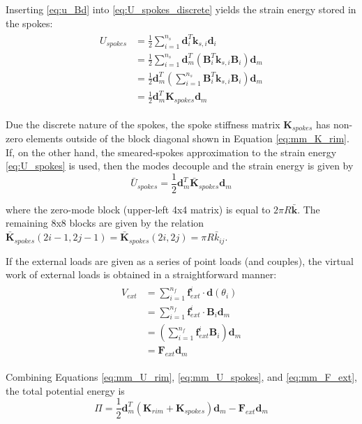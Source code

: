 \documentclass[\rootdir/thesis.tex]{subfiles}
\begin{document}
Inserting \eqref{eq:u_Bd} into \eqref{eq:U_spokes_discrete} yields the strain energy stored in the spokes:
\begin{align}
\label{eq:mm_U_spokes}
\begin{split}
U_{spokes} &= \frac{1}{2} \sum_{i=1}^{n_s} \mathbf{d}_i^T \mathbf{k}_{s,i} \mathbf{d}_i\\
&= \frac{1}{2} \sum_{i=1}^{n_s} \mathbf{d}_m^T \left(\mathbf{B}_i^T\mathbf{k}_{s, i}\mathbf{B}_i \right)\mathbf{d}_m\\
&= \frac{1}{2} \mathbf{d}_m^T \left(\sum_{i=1}^{n_s} \mathbf{B}_i^T\mathbf{k}_{s, i}\mathbf{B}_i \right) \mathbf{d}_m\\
&= \frac{1}{2} \mathbf{d}_m^T \mathbf{K}_{spokes} \mathbf{d}_m
\end{split}
\end{align}

Due the discrete nature of the spokes, the spoke stiffness matrix $\mathbf{K}_{spokes}$ has non-zero elements outside of the block diagonal shown in Equation \eqref{eq:mm_K_rim}. If, on the other hand, the smeared-spokes approximation to the strain energy \eqref{eq:U_spokes} is used, then the modes decouple and the strain energy is given by
\begin{equation}
\label{eq:U_spokes_smeared}
\bar{U}_{spokes} = \frac{1}{2} \mathbf{d}_m^T \bar{\mathbf{K}}_{spokes} \mathbf{d}_m
\end{equation}

where the zero-mode block (upper-left 4x4 matrix) is equal to $2\pi R\mathbf{\bar{k}}$. The remaining 8x8 blocks are given by the relation $\mathbf{\bar{K}}_{spokes}(2i-1, 2j-1) = \mathbf{\bar{K}}_{spokes}(2i, 2j) = \pi R \bar{k}_{ij}$.

If the external loads are given as a series of point loads (and couples), the virtual work of external loads is obtained in a straightforward manner:
\begin{align}
\label{eq:mm_F_ext}
\begin{split}
V_{ext} &= \sum_{i=1}^{n_f} \mathbf{f}_{ext}^i \cdot \mathbf{d}(\theta_i) \\
&= \sum_{i=1}^{n_f} \mathbf{f}_{ext}^i \cdot \mathbf{B}_i \mathbf{d}_m\\
&= \left(\sum_{i=1}^{n_f} \mathbf{f}_{ext}^i \mathbf{B}_i \right) \mathbf{d}_m\\
&= \mathbf{F}_{ext}\mathbf{d}_m
\end{split}
\end{align}

Combining Equations \eqref{eq:mm_U_rim}, \eqref{eq:mm_U_spokes}, and \eqref{eq:mm_F_ext}, the total potential energy is
\begin{equation}
\label{eq:mm_TotPot}
\Pi = \frac{1}{2} \mathbf{d}_m^T \left( \mathbf{K}_{rim} + \mathbf{K}_{spokes} \right) \mathbf{d}_m - \mathbf{F}_{ext}\mathbf{d}_m
\end{equation}
\end{document}
